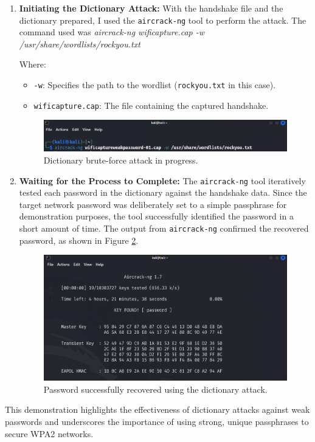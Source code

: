 \begin{enumerate}
\begin{enumerate}
        \item \textbf{Initiating the Dictionary Attack:} With the handshake file and the dictionary prepared, I used the \texttt{aircrack-ng} tool to perform the attack. The command used was \textit{aircrack-ng wificapture.cap -w /usr/share/wordlists/rockyou.txt}
        
        Where:
        \begin{itemize}
            \item \texttt{-w}: Specifies the path to the wordlist (\texttt{rockyou.txt} in this case).
            \item \texttt{wificapture.cap}: The file containing the captured handshake.
        \end{itemize}

        \begin{figure}[h!]
            \centering
            \includegraphics[width=0.8\linewidth]{images/rockyoucommand.png}
            \caption{Dictionary brute-force attack in progress.}
            \label{fig:rockyoucommand}
        \end{figure}

        \item \textbf{Waiting for the Process to Complete:} The \texttt{aircrack-ng} tool iteratively tested each password in the dictionary against the handshake data. Since the target network password was deliberately set to a simple passphrase for demonstration purposes, the tool successfully identified the password in a short amount of time. The output from \texttt{aircrack-ng} confirmed the recovered password, as shown in Figure \ref{fig:passwordfound}.

        \begin{figure}[h!]
            \centering
            \includegraphics[width=0.8\linewidth]{images/passwordfound.png}
            \caption{Password successfully recovered using the dictionary attack.}
            \label{fig:passwordfound}
        \end{figure}
    \end{enumerate}
    
    This demonstration highlights the effectiveness of dictionary attacks against weak passwords and underscores the importance of using strong, unique passphrases to secure WPA2 networks.
    
\end{enumerate}


